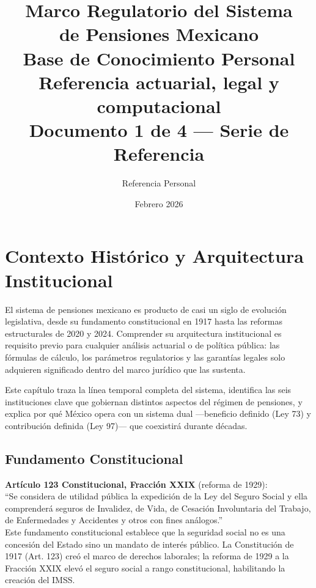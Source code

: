 \documentclass[11pt,a4paper]{report}
\title{
    \vspace{-2cm}
    {\Huge\bfseries Marco Regulatorio del Sistema\\de Pensiones Mexicano}\\[1cm]
    {\Large Base de Conocimiento Personal}\\[0.5cm]
    {\large Referencia actuarial, legal y computacional}\\[1cm]
    {\normalsize Documento 1 de 4 --- Serie de Referencia}
}
\author{Referencia Personal}
\date{Febrero 2026}
\begin{document}
\maketitle
\tableofcontents
\newpage

\chapter{Contexto Hist\'orico y Arquitectura Institucional}

El sistema de pensiones mexicano es producto de casi un siglo de evoluci\'on legislativa, desde su fundamento constitucional en 1917 hasta las reformas estructurales de 2020 y 2024. Comprender su arquitectura institucional es requisito previo para cualquier an\'alisis actuarial o de pol\'itica p\'ublica: las f\'ormulas de c\'alculo, los par\'ametros regulatorios y las garant\'ias legales solo adquieren significado dentro del marco jur\'idico que las sustenta.

Este cap\'itulo traza la l\'inea temporal completa del sistema, identifica las seis instituciones clave que gobiernan distintos aspectos del r\'egimen de pensiones, y explica por qu\'e M\'exico opera con un sistema dual ---beneficio definido (Ley 73) y contribuci\'on definida (Ley 97)--- que coexistir\'a durante d\'ecadas.

\section{Fundamento Constitucional}

\begin{tcolorbox}[colback=blue!5!white, colframe=blue!75!black, title=\textbf{Definici\'on Formal}]
\textbf{Art\'iculo 123 Constitucional, Fracci\'on XXIX} (reforma de 1929):\\[0.3em]
``Se considera de utilidad p\'ublica la expedici\'on de la Ley del Seguro Social y ella comprender\'a seguros de Invalidez, de Vida, de Cesaci\'on Involuntaria del Trabajo, de Enfermedades y Accidentes y otros con fines an\'alogos.''\\[0.5em]
Este fundamento constitucional establece que la seguridad social no es una concesi\'on del Estado sino un mandato de inter\'es p\'ublico. La Constituci\'on de 1917 (Art. 123) cre\'o el marco de derechos laborales; la reforma de 1929 a la Fracci\'on XXIX elev\'o el seguro social a rango constitucional, habilitando la creaci\'on del IMSS.
\end{tcolorbox}
\end{document}
